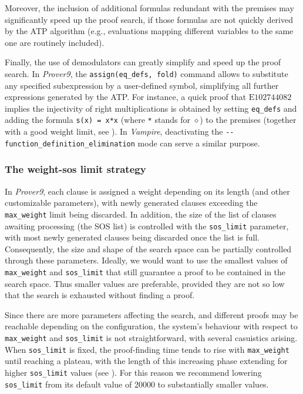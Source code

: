 \documentclass[12pt]{amsart}
\theoremstyle{definition}
\newcommand{\op}{\diamond}
\newcommand{\Eq}[1]{\mathrm{E}#1}
\begin{document}
Moreover, the inclusion of additional formulas redundant with the premises may significantly speed up the proof search, if those formulas are not quickly derived by the ATP algorithm (e.g., evaluations mapping different variables to the same one are routinely included).

Finally, the use of demodulators can greatly simplify and speed up the proof search. In \emph{Prover9}, the \verb|assign(eq_defs, fold)| command allows to substitute any specified subexpression by a user-defined symbol, simplifying all further expressions generated by the ATP\@. For instance, a quick proof that $\Eq{102744082}$ implies the injectivity of right multiplications is obtained by setting \verb|eq_defs| and adding the formula \verb|s(x) = x*x| (where \verb|*| stands for $\op$) to the premises (together with a good weight limit, see ). In \emph{Vampire}, deactivating the \verb|--function_definition_elimination| mode can serve a similar purpose.



\subsubsection{The weight-sos limit strategy}\label{weight_strategy}

In \emph{Prover9}, each clause is assigned a weight depending on its length (and other customizable parameters), with newly generated clauses exceeding the \verb|max_weight| limit being discarded. In addition, the size of the list of clauses awaiting processing (the SOS list) is controlled with the \verb|sos_limit| parameter, with most newly generated clauses being discarded once the list is full. Consequently, the size and shape of the search space can be partially controlled through these parameters. Ideally, we would want to use the smallest values of \verb|max_weight| and \verb|sos_limit| that still guarantee a proof to be contained in the search space. Thus smaller values are preferable, provided they are not so low that the search is exhausted without finding a proof.

Since there are more parameters affecting the search, and different proofs may be reachable depending on the configuration, the system's behaviour with respect to \verb|max_weight| and  \verb|sos_limit| is not straightforward, with several casuistics arising. When \verb|sos_limit| is fixed, the proof-finding time tends to rise with \verb|max_weight| until reaching a plateau, with the length of this increasing phase extending for higher \verb|sos_limit| values (see ). For this reason we recommend lowering \verb|sos_limit| from its default value of 20000 to substantially smaller values.
\end{document}
